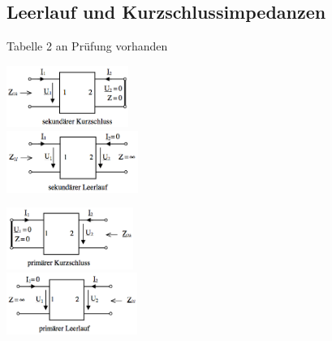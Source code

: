 \begin{multicols}{2}
\subsection{Leerlauf und Kurzschlussimpedanzen}
	Tabelle 2 an Prüfung vorhanden\\
		\begin{minipage}{4cm}
	    	\includegraphics[height=2cm]{./bilder/sekKurzschluss}\\
			\includegraphics[height=2cm]{./bilder/sekLeerlauf}
	    \end{minipage}
		\begin{minipage}{4cm}
	    	\includegraphics[height=2cm]{./bilder/primKurzschluss}\\
			\includegraphics[height=2cm]{./bilder/primLeerlauf}
	    \end{minipage}
	    
\end{multicols}

